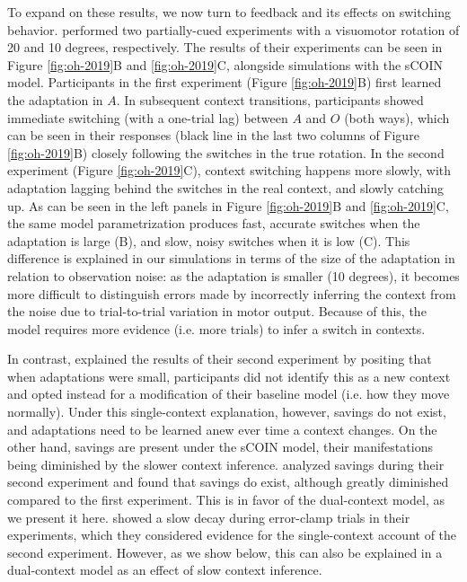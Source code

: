 \documentclass[a4paper,doc,floatsintext,natbib]{apa6}
\def \fref #1{Figure \ref{#1}}     %
\begin{document}
To expand on these results, we now turn to feedback and its effects on switching behavior. \cite{Oh_Minimizing_2019} performed two partially-cued experiments with a visuomotor rotation of 20 and 10 degrees, respectively. The results of their experiments can be seen in \fref{fig:oh-2019}B and \ref{fig:oh-2019}C, alongside simulations with the sCOIN model. Participants in the first experiment (\fref{fig:oh-2019}B) first learned the adaptation in $A$. In subsequent context transitions, participants showed immediate switching (with a one-trial lag) between $A$ and $O$ (both ways), which can be seen in their responses (black line in the last two columns of \fref{fig:oh-2019}B) closely following the switches in the true rotation. In the second experiment (\fref{fig:oh-2019}C), context switching happens more slowly, with adaptation lagging behind the switches in the real context, and slowly catching up. As can be seen in the left panels in \fref{fig:oh-2019}B and \ref{fig:oh-2019}C, the same model parametrization produces fast, accurate switches when the adaptation is large (B), and slow, noisy switches when it is low (C). This difference is explained in our simulations in terms of the size of the adaptation in relation to observation noise: as the adaptation is smaller (10 degrees), it becomes more difficult to distinguish errors made by incorrectly inferring the context from the noise due to trial-to-trial variation in motor output. Because of this, the model requires more evidence (i.e. more trials) to infer a switch in contexts.

In contrast, \cite{Oh_Minimizing_2019} explained the results of their second experiment by positing that when adaptations were small, participants did not identify this as a new context and opted instead for a modification of their baseline model (i.e. how they move normally). Under this single-context explanation, however, savings do not exist, and adaptations need to be learned anew ever time a context changes. On the other hand, savings are present under the sCOIN model, their manifestations being diminished by the slower context inference. \cite{Oh_Minimizing_2019} analyzed savings during their second experiment and found that savings do exist, although greatly diminished compared to the first experiment. This is in favor of the dual-context model, as we present it here. \cite{Oh_Minimizing_2019} showed a slow decay during error-clamp trials in their experiments, which they considered evidence for the single-context account of the second experiment. However, as we show below, this can also be explained in a dual-context model as an effect of slow context inference.
\end{document}
